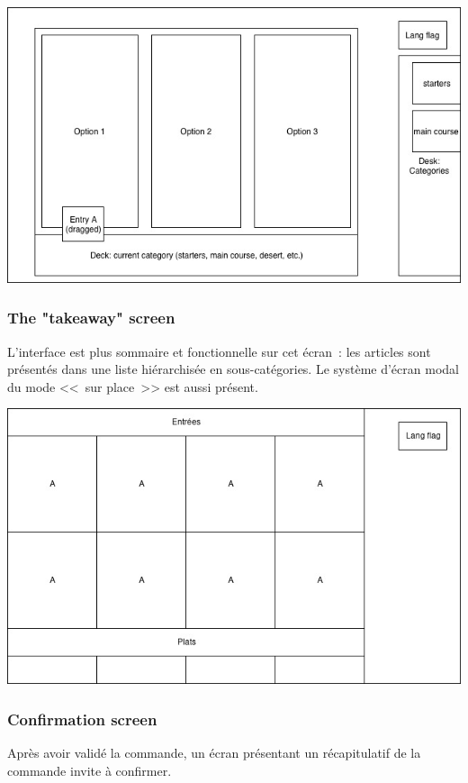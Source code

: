 \documentclass[a4paper,12pt]{article}
\begin{document}
\begin{center}
	\includegraphics[width=\textwidth]{in_place_drag_options.jpg}
\end{center}

\subsubsection{The "takeaway" screen}

L'interface est plus sommaire et fonctionnelle sur cet écran~: les articles sont présentés dans une liste hiérarchisée
en sous-catégories. Le système d'écran modal du mode <<~sur place~>> est aussi présent.

\begin{center}
	\includegraphics[width=\textwidth]{takeaway_screen.jpg}
\end{center}

\subsubsection{Confirmation screen}
Après avoir validé la commande, un écran présentant un récapitulatif de la commande invite à confirmer.
\end{document}
